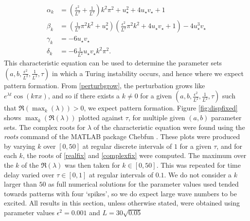 \begin{align}
\alpha_k&=(\frac{\epsilon^2}{L^2}+\frac{1}{L^2})k^2\pi^2+u_\star^2+4u_\star v_\star+1\\
\beta_k&=(\frac{1}{L^2}\pi^2k^2+u_\star^2)(\frac{\epsilon^2}{L^2}\pi^2k^2+4u_\star v_\star+1)-4u_\star^3v_\star\\
\gamma_k&=-6u_\star v_\star\\
\delta_k&=-6\frac{1}{L^2}u_\star v_\star k^2\pi^2.
\end{align}
This characteristic equation can be used to determine the parameter sets $(a,b,\frac{\epsilon^2}{L^2},\frac{1}{L^2},\tau)$ in which a Turing instability occurs, and hence where we expect pattern formation. From \eqref{perturbgrow}, the perturbation grows like $e^{\lambda t}\cos(k\pi x)$, and so if there exists a $k\neq0$ for a given $(a,b,\frac{\epsilon^2}{L^2},\frac{1}{L^2},\tau)$ such that $\Re(\max_k(\lambda))>0$, we expect pattern formation. Figure \ref{fig:dispfixed} shows $\max_k(\Re(\lambda))$ plotted against $\tau$, for multiple given $(a,b)$ parameter sets. The complex roots for $\lambda$ of the characteristic equation were found using the \emph{roots} command of the MATLAB package Chebfun \cite{chebfun}. These plots were produced by varying $k$ over $[0,50]$ at regular discrete intervals of $1$ for a given $\tau$, and for each $k$, the roots of \eqref{realfix} and \eqref{complexfix} were computed. The maximum over the $k$ of the $\Re(\lambda)$ was then taken for $k\in[0,50]$. This was repeated for time delay varied over $\tau\in[0,1]$ at regular intervals of $0.1$. We do not consider a $k$ larger than $50$ as full numerical solutions for the parameter values used tended towards patterns with four `spikes', so we do expect large wave numbers to be excited. All results in this section, unless otherwise stated, were obtained using parameter values $\epsilon^2=0.001$ and $L=30\sqrt{0.05}$

